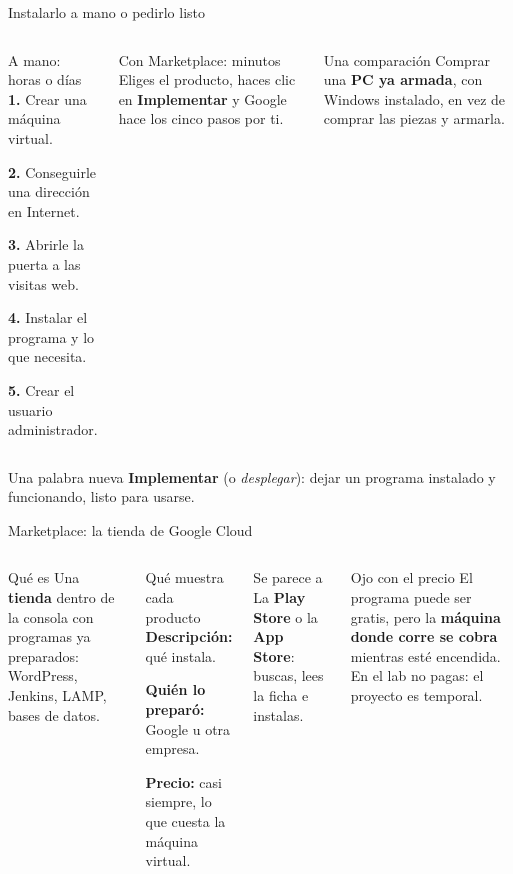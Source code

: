 \documentclass[aspectratio=169,10pt,c]{beamer}
\begin{document}
\begin{frame}{Instalarlo a mano o pedirlo listo}
\begin{columns}[T,onlytextwidth]
\begin{block}{A mano: horas o días}
\small
\textbf{1.} Crear una máquina virtual.\par
\textbf{2.} Conseguirle una dirección en Internet.\par
\textbf{3.} Abrirle la puerta a las visitas web.\par
\textbf{4.} Instalar el programa y lo que necesita.\par
\textbf{5.} Crear el usuario administrador.
\end{block}
\begin{exampleblock}{Con Marketplace: minutos}
\small Eliges el producto, haces clic en \textbf{Implementar} y Google hace los cinco pasos por ti.
\end{exampleblock}
\begin{block}{Una comparación}
\small Comprar una \textbf{PC ya armada}, con Windows instalado, en vez de comprar las piezas y armarla.
\end{block}
\end{columns}
\par\vspace{1mm}
\begin{alertblock}{Una palabra nueva}
\small \textbf{Implementar} (o \emph{desplegar}): dejar un programa instalado y funcionando, listo para usarse.
\end{alertblock}
\end{frame}

\begin{frame}{Marketplace: la tienda de Google Cloud}
\begin{columns}[T,onlytextwidth]
\begin{block}{Qué es}
\small Una \textbf{tienda} dentro de la consola con programas ya preparados: WordPress, Jenkins, LAMP, bases de datos.
\end{block}
\begin{block}{Qué muestra cada producto}
\small
\textbf{Descripción:} qué instala.\par
\textbf{Quién lo preparó:} Google u otra empresa.\par
\textbf{Precio:} casi siempre, lo que cuesta la máquina virtual.
\end{block}
\begin{exampleblock}{Se parece a}
\small La \textbf{Play Store} o la \textbf{App Store}: buscas, lees la ficha e instalas.
\end{exampleblock}
\begin{alertblock}{Ojo con el precio}
\small El programa puede ser gratis, pero la \textbf{máquina donde corre se cobra} mientras esté encendida. En el lab no pagas: el proyecto es temporal.
\end{alertblock}
\end{columns}
\end{frame}
\end{document}
